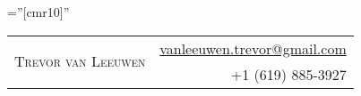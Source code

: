 \documentclass[letterpaper,10pt]{article}
\begin{document}
\pagestyle{empty} %

\font\fb=''[cmr10]'' %

\begin{adjustwidth}{-0.2cm}{}
\par{
    \begin{tabular}{lr}
        \multirow{2}{13.15cm}{\Huge{\textsc{Trevor van Leeuwen}}} & \href{mailto:vanleeuwen.trevor@gmail.com}{vanleeuwen.trevor@gmail.com} \\
         & +1 (619) 885-3927
    \end{tabular}
\medskip\par}
\end{adjustwidth}


\end{document}
